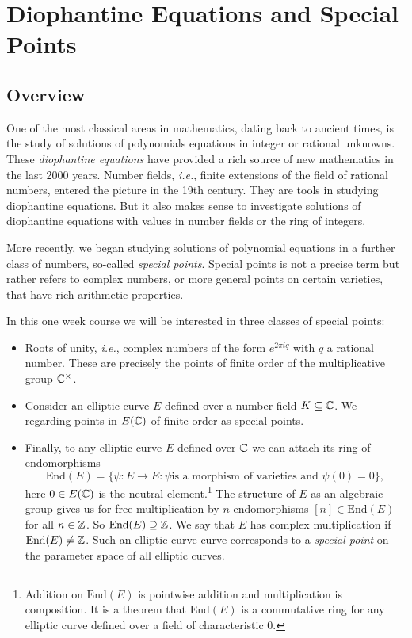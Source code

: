 \chapter{Diophantine Equations and Special Points}

\section{Overview}

One of the most classical areas in mathematics, dating back to ancient
times, is the study of solutions of polynomials equations in integer
or rational unknowns. These \textit{diophantine equations} have
provided a rich source of new mathematics in the last 2000 years.
Number fields, \textit{i.e.}, finite extensions of the field of
rational numbers, entered the picture in the 19th century. They are
tools in studying diophantine equations. But it also makes sense to
investigate solutions of diophantine equations with values in number
fields or the ring of integers.

More recently, we began studying solutions of polynomial equations in
a further class of numbers, so-called \textit{special points}. Special
points is not a precise term but rather refers to complex numbers, or
more general points on certain varieties, that have rich arithmetic
properties.

In this one week course we will be interested in three classes of
special points:
\begin{itemize}
\item Roots of unity, \textit{i.e.}, complex numbers of the form
  $e^{2\pi i q}$ with $q$ a rational number. These are precisely the
  points of finite order of the multiplicative group ${\mathbb{C}}^\times$. 

\item Consider an elliptic curve $E$ defined over a number field
  $K\subseteq{\mathbb{C}}$. We regarding points in $E({\mathbb{C}})$ of finite order as
  special points.

\item Finally, to any elliptic curve $E$ defined over ${\mathbb{C}}$ we can
  attach its ring of endomorphisms
  $$\mathrm{End}(E) = \{\psi \colon E\rightarrow E : \psi\text{
    is a morphism of varieties and }\psi(0)=0\},$$
  here $0\in E({\mathbb{C}})$ is the neutral element.\footnote{Addition on
    $\mathrm{End}(E)$ is pointwise addition and multiplication is
    composition. It is a theorem that $\mathrm{End}(E)$ is a
    commutative ring for any elliptic curve defined over a field of
    characteristic $0$.}
  The  structure of $E$ as an algebraic group gives us for free
  multiplication-by-$n$ endomorphisms $[n] \in \mathrm{End}(E)$ for
  all $n\in{\mathbb{Z}}$. So $\mathrm{End}(E) \supseteq {\mathbb{Z}}$.
  We say that $E$ has complex multiplication if
  $\mathrm{End}(E)\not={\mathbb{Z}}$.
  Such an elliptic curve curve corresponds to a \textit{special point}
  on the parameter space of all elliptic curves.   
\end{itemize}

